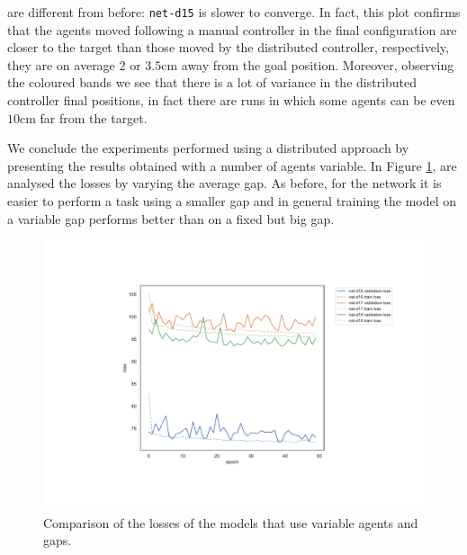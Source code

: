 \noindent
are different from before: \texttt{net-d15} is slower to converge. In fact, this plot 
confirms that the agents moved following a manual controller in the final 
configuration are closer to the target than those moved by the distributed 
controller, respectively, they are on average $2$ or $3.5$\gls{cm} away from the 
goal position. Moreover, observing the coloured bands we see that there is a lot of 
variance in the distributed controller final positions, in fact there are runs in which 
some agents can be even $10$\gls{cm} far from the target.

\bigskip
We conclude the experiments performed using a distributed approach by 
presenting the results obtained with a number of agents variable. 
In Figure \ref{fig:distlossnvar}, are analysed the losses by varying the average 
gap. As before, for the network it is easier to perform a task using a smaller gap 
and in general training the model on a variable gap performs better than on a 
fixed but big gap.
\begin{figure}[!htb]
	\centering
	\includegraphics[width=.9\textwidth]{contents/images/task1-extension/loss-distributed-Nvar@}%
	\caption{Comparison of the losses of the models that use variable agents and 	
	gaps.}
	\label{fig:distlossnvar}
\end{figure}

